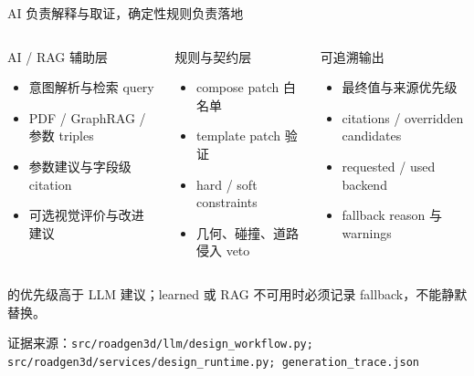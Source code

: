 \documentclass[aspectratio=169,10pt]{ctexbeamer}
\newcommand{\sourcefoot}[1]{\vfill{\scriptsize\color{hkustgrey}证据来源：\texttt{#1}}}
\begin{document}
\begin{frame}{AI 负责解释与取证，确定性规则负责落地}
  \begin{columns}[T,onlytextwidth]
      \begin{block}{AI / RAG 辅助层}
        \begin{itemize}
          \item 意图解析与检索 query
          \item PDF / GraphRAG / 参数 triples
          \item 参数建议与字段级 citation
          \item 可选视觉评价与改进建议
        \end{itemize}
      \end{block}
      \begin{alertblock}{规则与契约层}
        \begin{itemize}
          \item compose patch 白名单
          \item template patch 验证
          \item hard / soft constraints
          \item 几何、碰撞、道路侵入 veto
        \end{itemize}
      \end{alertblock}
      \begin{exampleblock}{可追溯输出}
        \begin{itemize}
          \item 最终值与来源优先级
          \item citations / overridden candidates
          \item requested / used backend
          \item fallback reason 与 warnings
        \end{itemize}
      \end{exampleblock}
  \end{columns}
  \deckgap
  \begin{callout}[关键不变量]
     的优先级高于 LLM 建议；learned 或 RAG 不可用时必须记录 fallback，不能静默替换。
  \end{callout}
  \sourcefoot{src/roadgen3d/llm/design\_workflow.py; src/roadgen3d/services/design\_runtime.py; generation\_trace.json}
\end{frame}
\end{document}
